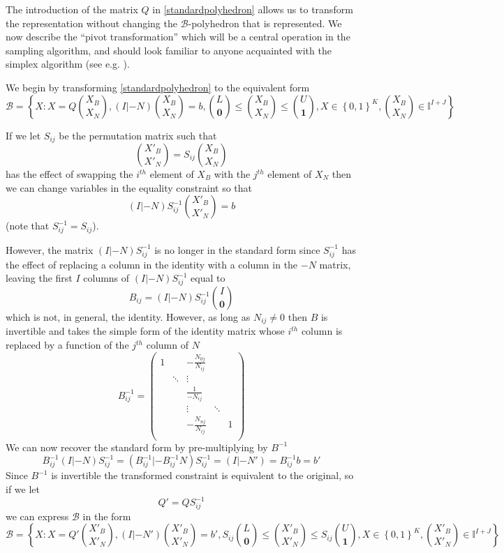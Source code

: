 \documentclass{article}
\begin{document}
The introduction of the matrix $Q$ in \ref{standardpolyhedron} allows us to transform the representation without changing the $\mathcal{B}$-polyhedron that is represented. We now describe the ``pivot transformation'' which will be a central operation in the sampling algorithm, and should look familiar to anyone acquainted with the simplex algorithm (see e.g. \cite{vanderbei2015linear}).

We begin by transforming \ref{standardpolyhedron} to the equivalent form
\begin{equation}
\mathcal{B} = \left\{X: X = Q{X_B\choose X_N}, (I|-N){X_B\choose X_N} = b, {L\choose \mathbf{0}} \le {X_B \choose X_N} \le {U\choose \mathbf{1}}, X \in \left\{ 0,1\right\}^K, {X_B\choose X_N} \in \mathbb{I}^{I+J} \right\}
\label{joinedpolyhedron}
\end{equation}

If we let $S_{ij}$ be the permutation matrix such that
\[
{X'_B\choose X'_N} = S_{ij}{X_B\choose X_N}
\]
has the effect of swapping the $i^{th}$ element of $X_B$ with the $j^{th}$ element of $X_N$ then we can change variables in the equality constraint so that
\[
(I|-N)S^{-1}_{ij}{X'_B \choose X'_N} = b
\]
(note that $S^{-1}_{ij} = S_{ij}$).

However, the matrix $(I|-N)S^{-1}_{ij}$ is no longer in the standard form since $S^{-1}_{ij}$ has the effect of replacing a column in the identity with a column in the $-N$ matrix, leaving the first $I$ columns of $(I|-N)S^{-1}_{ij}$ equal to
\[
B_{ij} = (I|-N)S^{-1}_{ij}{I \choose \mathbf{0}}
\]
which is not, in general, the identity. However, as long as $N_{ij} \ne 0$ then $B$ is invertible and takes the simple form of the identity matrix whose $i^{th}$ column is replaced by a function of the $j^{th}$ column of $N$
\[
B_{ij}^{-1} =  
\begin{pmatrix}
1 &  & -\frac{N_{0j}}{N_{ij}} & & \\
  & \ddots & \vdots & &\\
 & & \frac{1}{-N_{ij}} & &\\
  & & \vdots & \ddots &\\
  & & -\frac{N_{nj}}{N_{ij}} & &1\\
\end{pmatrix}
\]
We can now recover the standard form by pre-multiplying by $B^{-1}$
\begin{equation}
B_{ij}^{-1}(I|-N)S^{-1}_{ij} = (B_{ij}^{-1}|-B_{ij}^{-1}N)S^{-1}_{ij} = (I|-N') = B_{ij}^{-1}b  = b'
\label{Ntransform}
\end{equation}
Since $B^{-1}$ is invertible the transformed constraint is equivalent to the original, so if we let
\[
Q' = QS^{-1}_{ij}
\]
we can express $\mathcal{B}$ in the form
\begin{equation}
\mathcal{B} = \left\{X: X = Q'{X'_B\choose X'_N}, (I|-N'){X'_B\choose X'_N} = b', S_{ij}{L\choose \mathbf{0}} \le {X'_B \choose X'_N} \le S_{ij}{U\choose \mathbf{1}}, X \in \left\{ 0,1\right\}^K, {X'_B\choose X'_N} \in \mathbb{I}^{I+J} \right\}
\end{equation}
\end{document}
